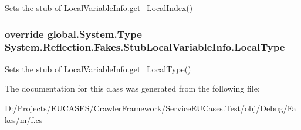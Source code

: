 Sets the stub of Local\-Variable\-Info.\-get\-\_\-\-Local\-Index()

\hypertarget{class_system_1_1_reflection_1_1_fakes_1_1_stub_local_variable_info_a5ea9ca62fd267301663a6b86d81a2c72}{
\subsubsection[{Local\-Type}]{\setlength{\rightskip}{0pt plus 5cm}override global.\-System.\-Type System.\-Reflection.\-Fakes.\-Stub\-Local\-Variable\-Info.\-Local\-Type\hspace{0.3cm}{\ttfamily [get]}}}\label{class_system_1_1_reflection_1_1_fakes_1_1_stub_local_variable_info_a5ea9ca62fd267301663a6b86d81a2c72}


Sets the stub of Local\-Variable\-Info.\-get\-\_\-\-Local\-Type()



The documentation for this class was generated from the following file\-:\begin{DoxyCompactItemize}
\item 
D\-:/\-Projects/\-E\-U\-C\-A\-S\-E\-S/\-Crawler\-Framework/\-Service\-E\-U\-Cases.\-Test/obj/\-Debug/\-Fakes/m/\hyperlink{m_2f_8cs}{f.\-cs}\end{DoxyCompactItemize}
